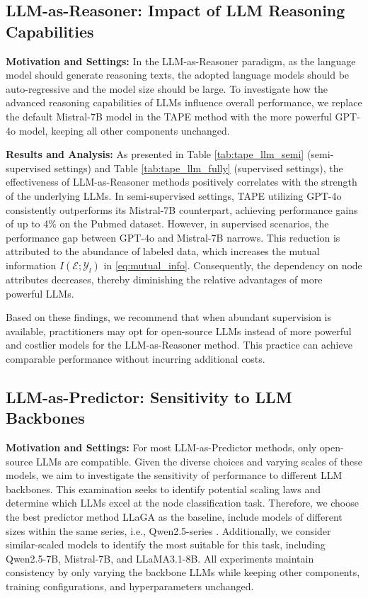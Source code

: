 





\subsection{LLM-as-Reasoner: Impact of LLM Reasoning Capabilities}

\textbf{Motivation and Settings: }In the LLM-as-Reasoner paradigm, as the language model should generate reasoning texts, the adopted language models should be auto-regressive and the model size should be large. To investigate how the advanced reasoning capabilities of LLMs influence overall performance, we replace the default Mistral-7B model in the TAPE method with the more powerful GPT-4o model, keeping all other components unchanged. 

\textbf{Results and Analysis: } As presented in Table \ref{tab:tape_llm_semi} (semi-supervised settings) and Table \ref{tab:tape_llm_fully} (supervised settings), the effectiveness of LLM-as-Reasoner methods positively correlates with the strength of the underlying LLMs. In semi-supervised settings, TAPE utilizing GPT-4o consistently outperforms its Mistral-7B counterpart, achieving performance gains of up to 4\% on the Pubmed dataset. However, in supervised scenarios, the performance gap between GPT-4o and Mistral-7B narrows. This reduction is attributed to the abundance of labeled data, which increases the mutual information $I(\mathcal{E}; \mathcal{Y}_l)$ in \eqref{eq:mutual_info}. Consequently, the dependency on node attributes decreases, thereby diminishing the relative advantages of more powerful LLMs. 

Based on these findings, we recommend that when abundant supervision is available, practitioners may opt for open-source LLMs instead of more powerful and costlier models for the LLM-as-Reasoner method. This practice can achieve comparable performance without incurring additional costs.

\subsection{LLM-as-Predictor: Sensitivity to LLM Backbones}

\textbf{Motivation and Settings: } For most LLM-as-Predictor methods, only open-source LLMs are compatible. Given the diverse choices and varying scales of these models, we aim to investigate the sensitivity of performance to different LLM backbones. This examination seeks to identify potential scaling laws and determine which LLMs excel at the node classification task. Therefore, we choose the best predictor method LLaGA as the baseline, include models of different sizes within the same series, i.e., Qwen2.5-series \cite{Yang2024Qwen2TR}. Additionally, we consider similar-scaled models to identify the most suitable for this task, including Qwen2.5-7B, Mistral-7B, and LLaMA3.1-8B. All experiments maintain consistency by only varying the backbone LLMs while keeping other components, training configurations, and hyperparameters unchanged.

